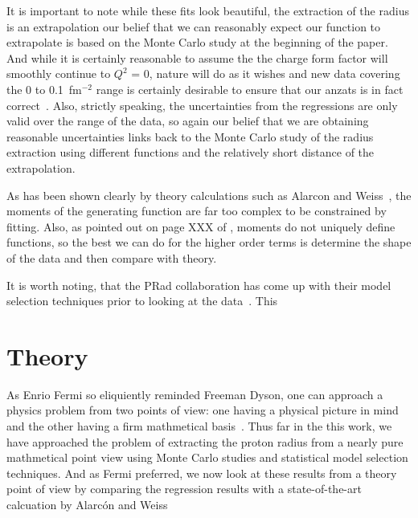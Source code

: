 \documentclass[10pt,aps,prc,twocolumn]{revtex4-1}
\begin{document}
It is important to note while these fits look beautiful, the extraction of the radius is an
extrapolation our belief that we can reasonably expect our function to extrapolate is based
on the Monte Carlo study at the beginning of the paper.    And while it is certainly reasonable
to assume the the charge form factor will smoothly continue to $Q^2$ = 0,
nature will do as it wishes and new data covering the 0 to 0.1~fm$^{-2}$ range is 
certainly desirable to ensure that our anzats is in fact correct~\cite{Gasparian:2014rna,
Peng:2016szv, Mihovilovic:2016rkr}.   
Also, strictly speaking, the
uncertainties from the regressions are only valid over the range of the data, so again our 
belief that we are obtaining reasonable uncertainties links back to the Monte Carlo study of the
radius extraction using different functions and the relatively short distance of the extrapolation.

As has been shown clearly by theory calculations
such as Alarcon and Weiss~\cite{}, the moments of the generating function are far too complex to be constrained
by fitting.  Also, as pointed out on page XXX of \cite{}, moments do not uniquely define functions, so the best
we can do for the higher order terms is determine the shape of the data and then compare with theory.



It is worth noting, that the PRad collaboration has come up with their model selection techniques
prior to looking at the data~\cite{Yan:2018bez}.   This 

\section{Theory}

As Enrio Fermi so eliquiently reminded Freeman Dyson, one can approach a physics problem from two points
of view: one having a physical picture in mind and the other having a firm mathmetical basis~\cite{Dyson:2004}.  
Thus far in the this work, we have approached the problem of extracting the proton radius from a nearly pure 
mathmetical point view using Monte Carlo studies and statistical model selection techniques.  
And as Fermi preferred, we now look at these results from a theory point of view by comparing the 
regression results with a state-of-the-art calcuation by Alarc\'{o}n and 
Weiss~\cite{Alarcon:2017ivh,Alarcon:2017chi,Alarcon:2017lhg,Alarcon:2012kn}
\end{document}
